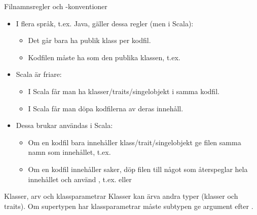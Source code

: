 \begin{Slide}{Filnamnsregler och -konventioner}\SlideFontSmall
\begin{itemize}
\item I flera språk, t.ex. Java, gäller dessa regler (men  i Scala):
\begin{itemize}\SlideFontTiny
\item Det går bara ha  publik klass per kodfil.
\item Kodfilen måste ha  som den publika klassen, t.ex. 
\end{itemize}
\item Scala är friare:
\begin{itemize}\SlideFontTiny
\item I Scala får man ha  klasser/traits/singelobjekt i samma kodfil.
\item I Scala får man döpa kodfilerna  av deras innehåll. \pause 
\end{itemize}

\item Dessa  brukar användas i Scala:
\begin{itemize}\SlideFontTiny
\item Om en kodfil bara innehåller  klass/trait/singelobjekt ge filen samma namn som innehållet, t.ex. 
\item Om en kodfil innehåller  saker, döp filen till något som återspeglar hela innehållet och använd , t.ex.  eller 
\end{itemize}
\end{itemize}
\end{Slide}


\begin{Slide}{Klasser, arv och klassparametrar}\SlideFontTiny
Klasser kan ärva andra typer (klasser och traits). Om supertypen har klassparametrar måste subtypen ge argument efter .

\ifkompendium
{}
\else
{}
\fi 
\end{Slide}



